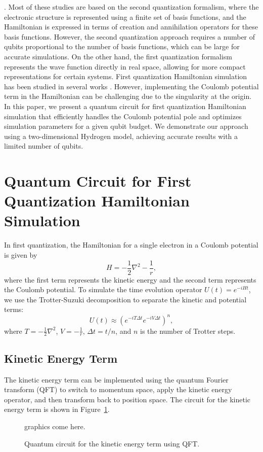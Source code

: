 \documentclass[A4]{article}
\begin{document}
\cite{Aspuru-Guzik2005.10.1126/science.1113479, kassal2008.pnas.0808245105, Whitfield2011, Reiher2017, Babbush2018,
Motta2020, Cao2019, McArdle2020, Kandala2017, OMalley2016, Kandala2019,
Kivlichan2018, Grimsley2019, Sugisaki2020, Takahashi2023}. Most of these
studies are based on the second quantization formalism, where the electronic
structure is represented using a finite set of basis functions, and the
Hamiltonian is expressed in terms of creation and annihilation operators for
these basis functions. However, the second quantization approach requires a
number of qubits proportional to the number of basis functions, which can be
large for accurate simulations. On the other hand, the first quantization
formalism represents the wave function directly in real space, allowing for
more compact representations for certain systems. First quantization Hamiltonian
simulation has been studied in several works \cite{Zalka1998, Kassal2006,
Babbush2018first, Kivlichan2017, Berry2019first, Childs2021first}. However,
implementing the Coulomb potential term in the Hamiltonian can be challenging due to
the singularity at the origin. In this paper, we present a quantum circuit for
first quantization Hamiltonian simulation that efficiently handles the Coulomb
potential pole and optimizes simulation parameters for a given qubit budget. We
demonstrate our approach using a two-dimensional Hydrogen model, achieving
accurate results with a limited number of qubits.
\section{Quantum Circuit for First Quantization Hamiltonian Simulation}
In first quantization, the Hamiltonian for a single electron in a Coulomb
potential is given by
\begin{equation}
H = -\frac{1}{2} \nabla^2 - \frac{1}{r},
\end{equation}
where the first term represents the kinetic energy and the second term
represents the Coulomb potential. To simulate the time evolution operator
$U(t) = e^{-iHt}$, we use the Trotter-Suzuki decomposition to separate the kinetic and
potential terms:
\begin{equation}
U(t) \approx \left( e^{-iT\Delta t} e^{-iV\Delta t} \right)^n,
\end{equation}
where $T = -\frac{1}{2} \nabla^2$, $V = -\frac{1}{r}$, $\Delta t = t/n$, and $n$ is the number of Trotter steps.
\subsection{Kinetic Energy Term}
The kinetic energy term can be implemented using the quantum Fourier transform
(QFT) to switch to momentum space, apply the kinetic energy operator, and then
transform back to position space. The circuit for the kinetic energy term is
shown in Figure~\ref{fig:kinetic}.
\begin{figure}[h]
\centering
graphics come here.
\caption{Quantum circuit for the kinetic energy term using QFT.}
\label{fig:kinetic}
\end{figure}
\end{document}
